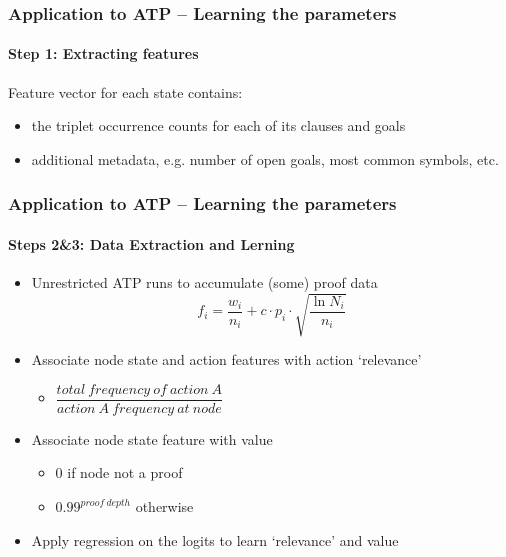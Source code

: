 \documentclass{beamer}
\begin{document}
\begin{frame}
\end{frame}
\begin{frame}
    \frametitle{Application to ATP -- Learning the parameters}
    \framesubtitle{\textbf{Step 1:} Extracting features}
    Feature vector for each state contains:
        \begin{itemize}
            \item the triplet occurrence counts for each of its clauses and goals
            \item additional metadata, e.g. number of open goals, most common symbols, etc.
        \end{itemize}
\end{frame}

\begin{frame}
    \frametitle{Application to ATP -- Learning the parameters}
    \framesubtitle{\textbf{Steps 2\&3:} Data Extraction and Lerning}
    \begin{itemize}
        \item Unrestricted ATP runs to accumulate (some) proof data
        \begin{equation*}
            f_i=\frac{w_i}{n_i}+c\cdot p_i \cdot \sqrt{\frac{\ln N_i}{n_i}}
        \end{equation*}
        \item Associate node state and action features 
            with action `relevance'
            \begin{itemize}
                \item $\dfrac{total\ frequency\ of\ action\ A}{action\ A\ frequency\ at\ node}$
            \end{itemize}
        \item Associate node state feature with value
            \begin{itemize}
                \item 0 if node not a proof
                \item $0.99^{proof\ depth}$ otherwise
            \end{itemize}
        \item Apply regression on the logits to learn `relevance' and value
    \end{itemize}
\end{frame}
\end{document}
